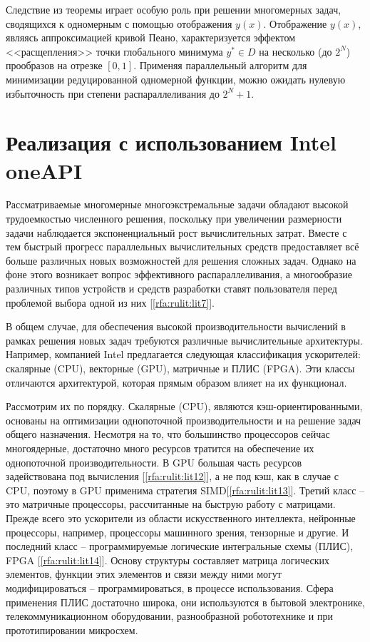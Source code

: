 \documentclass[10pt,a4paper]{book}
\begin{document}
Следствие из теоремы играет особую роль при решении многомерных задач, сводящихся к одномерным с помощью отображения $y(x)$. Отображение $y(x)$, являясь аппроксимацией кривой Пеано, характеризуется эффектом <<расщепления>> точки глобального минимума $y^* \in D$ на несколько (до $2^N$) прообразов на отрезке $[0,1]$. Применяя параллельный алгоритм для минимизации редуцированной одномерной функции, можно ожидать нулевую избыточность при степени распараллеливания до $2^N+1$.


\section{Реализация с использованием Intel oneAPI}


Рассматриваемые многомерные многоэкстремальные задачи обладают высокой трудоемкостью численного решения, поскольку при увеличении размерности задачи наблюдается экспоненциальный рост вычислительных затрат. Вместе с тем быстрый прогресс параллельных вычислительных средств предоставляет всё больше различных новых возможностей для решения сложных задач. Однако на фоне этого возникает вопрос эффективного распараллеливания, а многообразие различных типов устройств и средств разработки ставят пользователя перед проблемой выбора одной из них [\ref{rfa:rulit:lit7}].

В общем случае, для обеспечения высокой производительности вычислений в рамках решения новых задач требуются различные вычислительные архитектуры. Например, компанией Intel предлагается следующая классификация ускорителей: скалярные (CPU), векторные (GPU), матричные и ПЛИС (FPGA). Эти классы отличаются архитектурой, которая прямым образом влияет на их функционал.
 
Рассмотрим их по порядку. Скалярные (CPU), являются кэш-ориентированными, основаны на оптимизации однопоточной производительности и на решение задач общего назначения. Несмотря на то, что большинство процессоров сейчас многоядерные, достаточно много ресурсов тратится на обеспечение их однопоточной производительности. В GPU большая часть ресурсов задействована под вычисления [\ref{rfa:rulit:lit12}], а не под кэш, как в случае с CPU, поэтому в GPU применима стратегия SIMD[\ref{rfa:rulit:lit13}].   Третий класс -- это матричные процессоры, рассчитанные на быструю работу с матрицами. Прежде всего это ускорители из области искусственного интеллекта, нейронные процессоры, например, процессоры машинного зрения, тензорные и другие. И последний класс -- программируемые логические интегральные схемы (ПЛИС), FPGA [\ref{rfa:rulit:lit14}]. Основу структуры составляет матрица логических элементов, функции этих элементов и связи между ними могут модифицироваться – программироваться, в процессе использования. Сфера применения ПЛИС достаточно широка, они используются в бытовой электронике, телекоммуникационном оборудовании, разнообразной робототехнике и при прототипировании микросхем.
\end{document}
